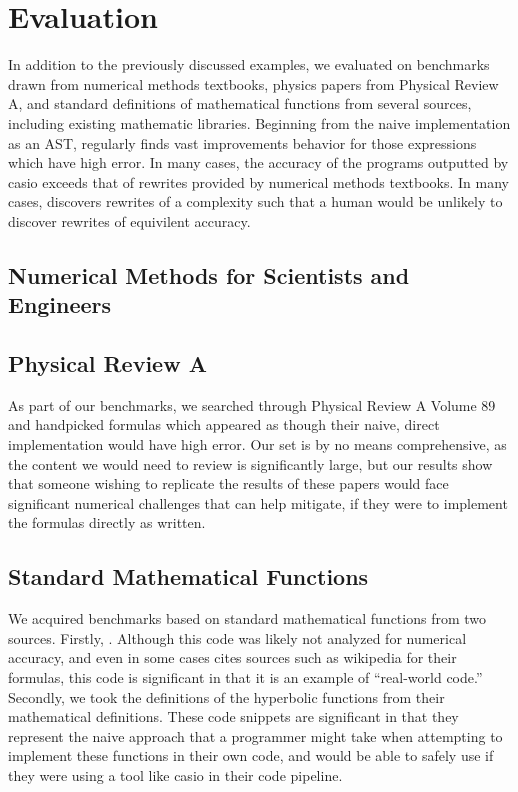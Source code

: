 \documentclass[paper.tex]{subfiles}
\begin{document}
\section{Evaluation}


In addition to the previously discussed examples,
we evaluated \casio on benchmarks drawn from
numerical methods textbooks,
physics papers from Physical Review A,
and standard definitions of mathematical functions from several sources,
including existing mathematic libraries.
Beginning from the naive implementation as an AST,
\casio regularly finds vast improvements behavior for those expressions which have high error.
In many cases, the accuracy of the programs outputted by casio 
exceeds that of rewrites provided by numerical methods textbooks.
In many cases, \casio discovers rewrites of a complexity 
such that a human would be unlikely to discover rewrites of equivilent accuracy.

\subsection{Numerical Methods for Scientists and Engineers}

\subsection{Physical Review A}

As part of our benchmarks, we searched through Physical Review A Volume 89
and handpicked formulas which appeared as though
their naive, direct implementation would have high error.
Our set is by no means comprehensive,
as the content we would need to review is significantly large,
but our results show that someone wishing to replicate the results of these papers
would face significant numerical challenges that \casio can help mitigate,
if they were to implement the formulas directly as written.

\subsection{Standard Mathematical Functions}

We acquired benchmarks based on standard mathematical functions from two sources.
Firstly, .
Although this code was likely not analyzed for numerical accuracy,
and even in some cases cites sources such as wikipedia for their formulas,
this code is significant in that it is an example of ``real-world code.''
Secondly, we took the definitions of the hyperbolic functions from their mathematical definitions.
These code snippets are significant in that
they represent the naive approach that a programmer might take
when attempting to implement these functions in their own code,
and would be able to safely use if they were using a tool like casio
in their code pipeline.
\end{document}
